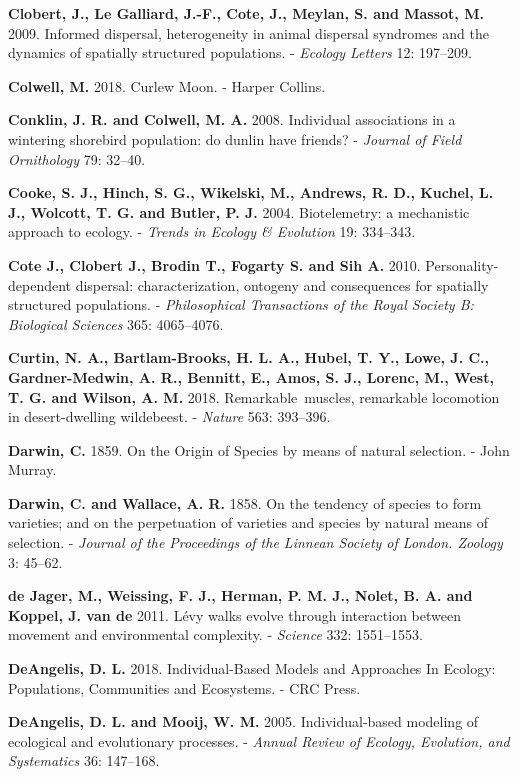 \documentclass[]{scrartcl}
\begin{document}
\begin{multicols}{2}
\textbf{Clobert, J., Le Galliard, J.-F., Cote, J., Meylan, S. and
Massot, M.} 2009. Informed dispersal, heterogeneity in animal dispersal
syndromes and the dynamics of spatially structured populations. -
\emph{Ecology Letters} 12: 197--209.

\textbf{Colwell, M.} 2018. Curlew Moon. - Harper Collins.

\textbf{Conklin, J. R. and Colwell, M. A.} 2008. Individual associations
in a wintering shorebird population: do dunlin have friends? -
\emph{Journal of Field Ornithology} 79: 32--40.

\textbf{Cooke, S. J., Hinch, S. G., Wikelski, M., Andrews, R. D.,
Kuchel, L. J., Wolcott, T. G. and Butler, P. J.} 2004. Biotelemetry: a
mechanistic approach to ecology. - \emph{Trends in Ecology \& Evolution}
19: 334--343.

\textbf{Cote J., Clobert J., Brodin T., Fogarty S. and Sih A.} 2010.
Personality-dependent dispersal: characterization, ontogeny and
consequences for spatially structured populations. - \emph{Philosophical
Transactions of the Royal Society B: Biological Sciences} 365:
4065--4076.

\textbf{Curtin, N. A., Bartlam-Brooks, H. L. A., Hubel, T. Y., Lowe, J.
C., Gardner-Medwin, A. R., Bennitt, E., Amos, S. J., Lorenc, M., West,
T. G. and Wilson, A. M.} 2018. Remarkable~muscles, remarkable locomotion
in desert-dwelling wildebeest. - \emph{Nature} 563: 393--396.

\textbf{Darwin, C.} 1859. On the Origin of Species by means of natural
selection. - John Murray.

\textbf{Darwin, C. and Wallace, A. R.} 1858. On the tendency of species
to form varieties; and on the perpetuation of varieties and species by
natural means of selection. - \emph{Journal of the Proceedings of the
Linnean Society of London. Zoology} 3: 45--62.

\textbf{de Jager, M., Weissing, F. J., Herman, P. M. J., Nolet, B. A.
and Koppel, J. van de} 2011. Lévy walks evolve through interaction
between movement and environmental complexity. - \emph{Science} 332:
1551--1553.

\textbf{DeAngelis, D. L.} 2018. Individual-Based Models and Approaches
In Ecology: Populations, Communities and Ecosystems. - CRC Press.

\textbf{DeAngelis, D. L. and Mooij, W. M.} 2005. Individual-based
modeling of ecological and evolutionary processes. - \emph{Annual Review
of Ecology, Evolution, and Systematics} 36: 147--168.


\end{multicols}
\end{document}

